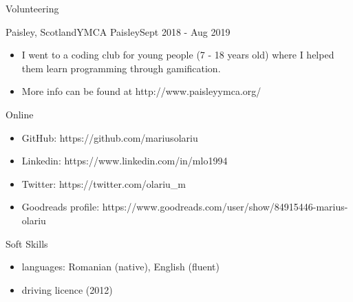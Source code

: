 \documentclass[]{mcdowellcv}
\begin{document}
	\begin{cvsection}{Volunteering}
		\begin{cvsubsection}{Paisley, Scotland}{YMCA Paisley}{Sept 2018 - Aug 2019}
			\begin{itemize}
				\item I went to a coding club for young people (7 - 18 years old) where I helped them learn programming through gamification. 
				\item More info can be found at http://www.paisleyymca.org/
			\end{itemize}
		\end{cvsubsection}
	\end{cvsection}

	\begin{cvsection}{Online}
		\begin{cvsubsection}{}{}{}
			\begin{itemize}
				\item GitHub: https://github.com/mariusolariu
				\item Linkedin: https://www.linkedin.com/in/mlo1994
				\item Twitter: https://twitter.com/olariu\_m
				\item Goodreads profile: https://www.goodreads.com/user/show/84915446-marius-olariu
			\end{itemize}
		\end{cvsubsection}
	\end{cvsection}

	\begin{cvsection}{Soft Skills}
		\begin{cvsubsection}{}{}{}
			\begin{itemize}
				\item languages: Romanian (native), English (fluent)
				\item driving licence (2012)
			\end{itemize}
		\end{cvsubsection}
	\end{cvsection}
	
\end{document}
